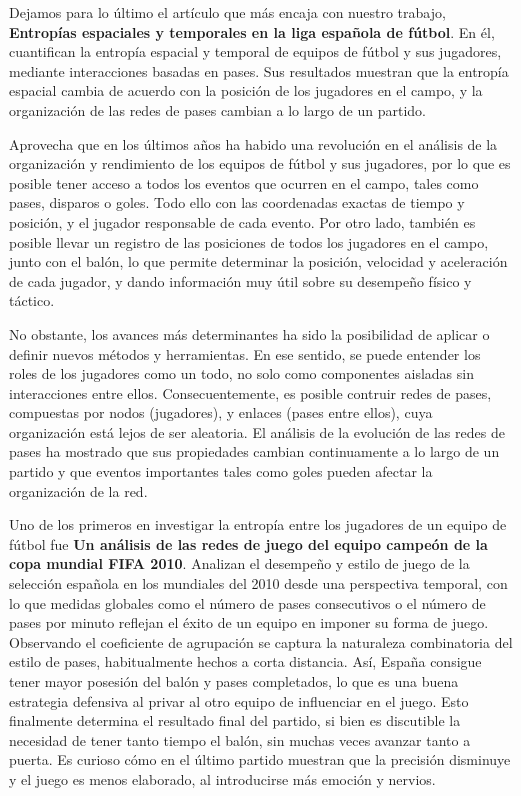 Dejamos para lo último el artículo que más encaja con nuestro trabajo,
\textbf{Entropías espaciales y temporales en la liga española de fútbol}\cite{spatial-and-temporal-entropies}. 
En él, cuantifican la entropía espacial y temporal de equipos de fútbol y sus jugadores, 
mediante interacciones basadas en pases. Sus resultados muestran que la entropía 
espacial cambia de acuerdo con la posición de los jugadores en el campo, y la 
organización de las redes de pases cambian a lo largo de un partido. 

Aprovecha que en los últimos años ha habido una revolución en el análisis de la organización 
y rendimiento de los equipos de fútbol y sus jugadores, por lo que es posible tener acceso a todos los 
eventos que ocurren en el campo, tales como pases, disparos o goles.
Todo ello con las coordenadas exactas de tiempo y posición, y el jugador responsable de cada 
evento. Por otro lado, también es posible llevar un registro de las posiciones de todos los 
jugadores en el campo, junto con el balón, lo que 
permite determinar la posición, velocidad y aceleración de cada jugador, y dando información 
muy útil sobre su desempeño físico y táctico.

No obstante, los avances más determinantes ha sido la posibilidad de aplicar o definir nuevos métodos 
y herramientas. En ese sentido, se puede 
entender los roles de los jugadores como un todo, no solo como componentes aisladas sin 
interacciones entre ellos. Consecuentemente, es posible contruir redes de pases, compuestas 
por nodos (jugadores), y enlaces (pases entre ellos), cuya organización está lejos de ser 
aleatoria. El análisis de la evolución de las redes de pases ha mostrado que sus propiedades 
cambian continuamente a lo largo de un partido y que eventos importantes tales como goles 
pueden afectar la organización de la red.

Uno de los primeros en investigar la entropía entre los jugadores de un equipo de 
fútbol fue \textbf{Un análisis de las redes de juego del equipo campeón de la copa 
mundial FIFA 2010}\cite{network-analysis}. Analizan el desempeño y estilo de juego de la selección española en los mundiales del 2010 desde una 
perspectiva temporal, con lo que medidas globales como el número de pases consecutivos o el número de 
pases por minuto reflejan el éxito de un equipo en imponer su forma de juego. Observando el coeficiente 
de agrupación se captura la naturaleza combinatoria del estilo de pases, habitualmente hechos a corta distancia.
Así, España consigue tener mayor posesión del balón y pases completados, lo que es una buena estrategia defensiva 
al privar al otro equipo de influenciar en el juego. Esto finalmente determina el resultado final del partido, 
si bien es discutible la necesidad de tener tanto tiempo el balón, sin muchas veces avanzar tanto a puerta. Es 
curioso cómo en el último partido muestran que la precisión disminuye y el juego es menos elaborado, al introducirse 
más emoción y nervios.


 